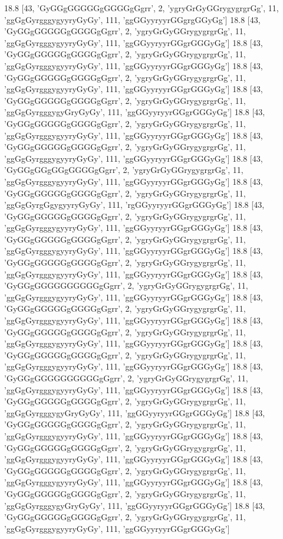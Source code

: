 18.8 [43, 'GyGGgGGGGGgGGGGgGgrr', 2, 'ygryGrGyGGrygygrgrGg', 11, 'ggGgGyrgggygyyryGyGy', 111, 'ggGGyyryyrGGgrgGGyGg']
18.8 [43, 'GyGGgGGGGGgGGGGgGgrr', 2, 'ygryGrGyGGrygygrgrGg', 11, 'ggGgGyrgggygyyryGyGy', 111, 'ggGGyyryyrGGgrGGGyGg']
18.8 [43, 'GyGGgGGGGGgGGGGgGgrr', 2, 'ygryGrGyGGrygygrgrGg', 11, 'ggGgGyrgggygyyryGyGy', 111, 'ggGGyyryyrGGgrGGGyGg']
18.8 [43, 'GyGGgGGGGGgGGGGgGgrr', 2, 'ygryGrGyGGrygygrgrGg', 11, 'ggGgGyrgggygyyryGyGy', 111, 'ggGGyyryyrGGgrGGGyGg']
18.8 [43, 'GyGGgGGGGGgGGGGgGgrr', 2, 'ygryGrGyGGrygygrgrGg', 11, 'ggGgGyrgggygyGryGyGy', 111, 'ggGGyyryyrGGgrGGGyGg']
18.8 [43, 'GyGGgGGGGGgGGGGgGgrr', 2, 'ygryGrGyGGrygygrgrGg', 11, 'ggGgGyrgggygyyryGyGy', 111, 'ggGGyyryyrGGgrGGGyGg']
18.8 [43, 'GyGGgGGGGGgGGGGgGgrr', 2, 'ygryGrGyGGrygygrgrGg', 11, 'ggGgGyrgggygyyryGyGy', 111, 'ggGGyyryyrGGgrGGGyGg']
18.8 [43, 'GyGGgGGgGGgGGGGgGgrr', 2, 'ygryGrGyGGrygygrgrGg', 11, 'ggGgGyrgggygyyryGyGy', 111, 'ggGGyyryyrGGgrGGGyGg']
18.8 [43, 'GyGGgGGGGGgGGGGgGgrr', 2, 'ygryGrGyGGrygygrgrGg', 11, 'ggGgGyrgGgygyyryGyGy', 111, 'rgGGyyryyrGGgrGGGyGg']
18.8 [43, 'GyGGgGGGGGgGGGGgGgrr', 2, 'ygryGrGyGGrygygrgrGg', 11, 'ggGgGyrgggygyyryGyGy', 111, 'ggGGyyryyrGGgrGGGyGg']
18.8 [43, 'GyGGgGGGGGgGGGGgGgrr', 2, 'ygryGrGyGGrygygrgrGg', 11, 'ggGgGyrgggygyyryGyGy', 111, 'ggGGyyryyrGGgrGGGyGg']
18.8 [43, 'GyGGgGGGGGgGGGGgGgrr', 2, 'ygryGrGyGGrygygrgrGg', 11, 'ggGgGyrgggygyyryGyGy', 111, 'ggGGyyryyrGGgrGGGyGg']
18.8 [43, 'GyGGgGGGGGGGGGGgGgrr', 2, 'ygryGrGyGGrygygrgrGg', 11, 'ggGgGyrgggygyyryGyGy', 111, 'ggGGyyryyrGGgrGGGyGg']
18.8 [43, 'GyGGgGGGGGgGGGGgGgrr', 2, 'ygryGrGyGGrygygrgrGg', 11, 'ggGgGyrgggygyyryGyGy', 111, 'ggGGyyryyrGGgrGGGyGg']
18.8 [43, 'GyGGgGGGGGgGGGGgGgrr', 2, 'ygryGrGyGGrygygrgrGg', 11, 'ggGgGyrgggygyyryGyGy', 111, 'ggGGyyryyrGGgrGGGyGg']
18.8 [43, 'GyGGgGGGGGgGGGGgGgrr', 2, 'ygryGrGyGGrygygrgrGg', 11, 'ggGgGyrgggygyyryGyGy', 111, 'ggGGyyryyrGGgrGGGyGg']
18.8 [43, 'GyGGgGGGGGGGGGGgGgrr', 2, 'ygryGrGyGGrygygrgrGg', 11, 'ggGgGyrgggygyyryGyGy', 111, 'ggGGyyryyrGGgrGGGyGg']
18.8 [43, 'GyGGgGGGGGgGGGGgGgrr', 2, 'ygryGrGyGGrygygrgrGg', 11, 'ggGgGyrgggygyGryGyGy', 111, 'ggGGyyryyrGGgrGGGyGg']
18.8 [43, 'GyGGgGGGGGgGGGGgGgrr', 2, 'ygryGrGyGGrygygrgrGg', 11, 'ggGgGyrgggygyyryGyGy', 111, 'ggGGyyryyrGGgrGGGyGg']
18.8 [43, 'GyGGgGGGGGgGGGGgGgrr', 2, 'ygryGrGyGGrygygrgrGg', 11, 'ggGgGyrgggygyyryGyGy', 111, 'ggGGyyryyrGGgrGGGyGg']
18.8 [43, 'GyGGgGGGGGgGGGGgGgrr', 2, 'ygryGrGyGGrygygrgrGg', 11, 'ggGgGyrgggygyyryGyGy', 111, 'ggGGyyryyrGGgrGGGyGg']
18.8 [43, 'GyGGgGGGGGgGGGGgGgrr', 2, 'ygryGrGyGGrygygrgrGg', 11, 'ggGgGyrgggygyGryGyGy', 111, 'ggGGyyryyrGGgrGGGyGg']
18.8 [43, 'GyGGgGGGGGgGGGGgGgrr', 2, 'ygryGrGyGGrygygrgrGg', 11, 'ggGgGyrgggygyyryGyGy', 111, 'ggGGyyryyrGGgrGGGyGg']
